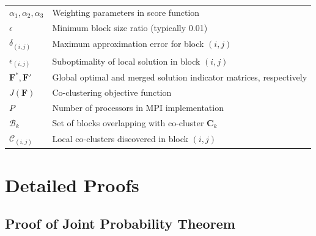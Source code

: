 \documentclass[journal]{IEEEtran}
\theoremstyle{definition}
\theoremstyle{remark} %
\begin{document}
\begin{table}[htbp]
\begin{tabular}{@{} p{} p{} @{}}
        $\alpha_1, \alpha_2, \alpha_3$     & Weighting parameters in score function                                                        \\
        $\epsilon$                         & Minimum block size ratio (typically 0.01)                                                     \\
        $\delta_{(i,j)}$                   & Maximum approximation error for block $(i,j)$                                                 \\
        $\epsilon_{(i,j)}$                 & Suboptimality of local solution in block $(i,j)$                                              \\
        $\mathbf{F}^*, \mathbf{F}'$        & Global optimal and merged solution indicator matrices, respectively                           \\
        $J(\mathbf{F})$                    & Co-clustering objective function                                                              \\
        $P$                                & Number of processors in MPI implementation                                                    \\
        $\mathcal{B}_k$                    & Set of blocks overlapping with co-cluster $\mathbf{C}_k$                                      \\
        $\mathcal{C}_{(i,j)}$              & Local co-clusters discovered in block $(i,j)$                                                 \\
        \bottomrule
    \end{tabular}
\end{table}

\section{Detailed Proofs}
\label{appendix:proofs}

\subsection{Proof of Joint Probability Theorem}
\label{appendix:proof-joint-probability}
\end{document}
